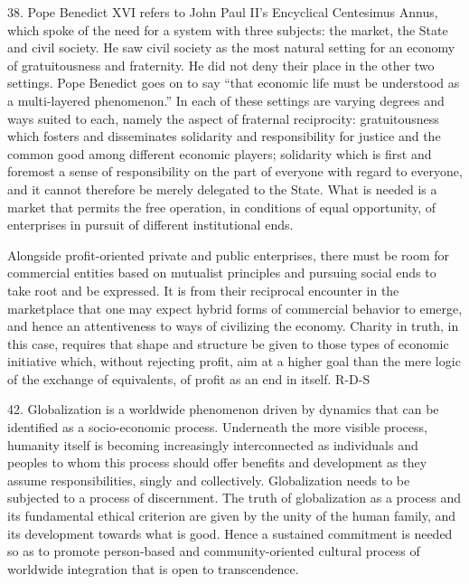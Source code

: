 \documentclass[oneside]{book}
\begin{document}
38. Pope Benedict XVI refers to John Paul II's Encyclical Centesimus Annus,
which spoke of the need for a system with three subjects: the market, the State
and civil society. He saw civil society as the most natural setting for an
economy of gratuitousness and fraternity. He did not deny their place in the
other two settings. Pope Benedict goes on to say ``that economic life must be
understood as a multi-layered phenomenon.'' In each of these settings are
varying degrees and ways suited to each, namely the aspect of fraternal
reciprocity: gratuitousness which fosters and disseminates solidarity and
responsibility for justice and the common good among different economic players;
solidarity which is first and foremost a sense of responsibility on the part of
everyone with regard to everyone, and it cannot therefore be merely delegated to
the State. What is needed is a market that permits the free operation, in
conditions of equal opportunity, of enterprises in pursuit of different
institutional ends.

Alongside profit-oriented private and public enterprises, there must be room for
commercial entities based on mutualist principles and pursuing social ends to
take root and be expressed. It is from their reciprocal encounter in the
marketplace that one may expect hybrid forms of commercial behavior to emerge,
and hence an attentiveness to ways of civilizing the economy. Charity in truth,
in this case, requires that shape and structure be given to those types of
economic initiative which, without rejecting profit, aim at a higher goal than
the mere logic of the exchange of equivalents, of profit as an end in itself.
R-D-S

42. Globalization is a worldwide phenomenon driven by dynamics that can be
identified as a socio-economic process. Underneath the more visible process,
humanity itself is becoming increasingly interconnected as individuals and
peoples to whom this process should offer benefits and development as they
assume responsibilities, singly and collectively. Globalization needs to be
subjected to a process of discernment. The truth of globalization as a process
and its fundamental ethical criterion are given by the unity of the human
family, and its development towards what is good. Hence a sustained commitment
is needed so as to promote person-based and community-oriented cultural process
of worldwide integration that is open to transcendence.
\end{document}
